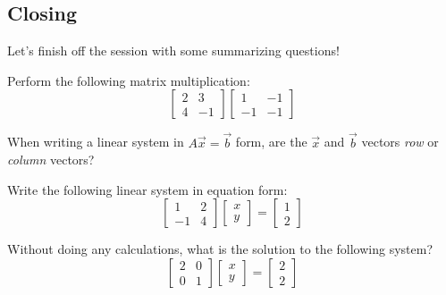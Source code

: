\documentclass[11pt]{exam}
\begin{document}
    \pagebreak
    \subsection{Closing}
    Let's finish off the session with some summarizing questions!
    \begin{questions}
        \item Perform the following matrix multiplication:
        $$\begin{bmatrix} 2 & 3 \\ 4 & -1 \end{bmatrix} \begin{bmatrix} 1 & -1 \\ -1 & -1 \end{bmatrix}$$
        \item When writing a linear system in $A\vec{x} = \vec{b}$ form, are the $\vec{x}$ and $\vec{b}$ vectors \textit{row} or \textit{column} vectors?
        \item Write the following linear system in equation form:
        $$\begin{bmatrix} 1 & 2 \\ -1 & 4 \end{bmatrix} \begin{bmatrix} x \\ y \end{bmatrix} = \begin{bmatrix} 1 \\ 2 \end{bmatrix}$$
        \item Without doing any calculations, what is the solution to the following system?
        $$\begin{bmatrix} 2 & 0 \\ 0 & 1 \end{bmatrix} \begin{bmatrix} x \\ y \end{bmatrix} = \begin{bmatrix} 2 \\ 2 \end{bmatrix}$$
    \end{questions}
    
\end{document}

